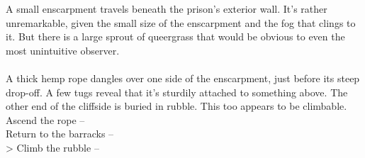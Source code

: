 A small enscarpment travels beneath the prison's exterior wall. It’s rather unremarkable, given the small size of the enscarpment and the fog that clings to it. But there is a large sprout of queergrass that would be obvious to even the most unintuitive observer.\\
\\

A thick hemp rope dangles over one side of the enscarpment, just before its steep drop-off. A few tugs reveal that it’s sturdily attached to something above. The other end of the cliffside is buried in rubble. This too appears to be climbable.\\

 Ascend the rope -- \\
 Return to the barracks -- \\
> Climb the rubble -- 